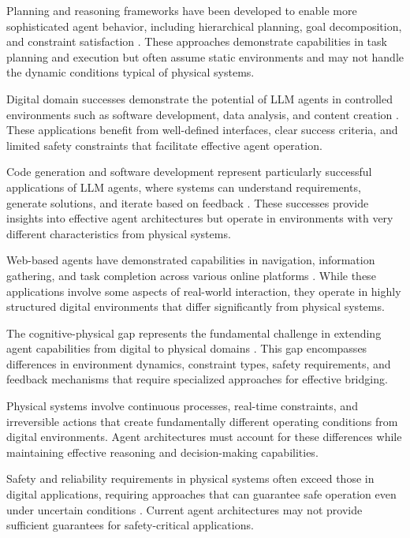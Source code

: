 Planning and reasoning frameworks have been developed to enable more sophisticated agent behavior, including hierarchical planning, goal decomposition, and constraint satisfaction \cite{huang2022language, ahn2022can}. These approaches demonstrate capabilities in task planning and execution but often assume static environments and may not handle the dynamic conditions typical of physical systems.

Digital domain successes demonstrate the potential of LLM agents in controlled environments such as software development, data analysis, and content creation \cite{nijkamp2022codegen, chen2021evaluating}. These applications benefit from well-defined interfaces, clear success criteria, and limited safety constraints that facilitate effective agent operation.

Code generation and software development represent particularly successful applications of LLM agents, where systems can understand requirements, generate solutions, and iterate based on feedback \cite{austin2021program, li2022competition}. These successes provide insights into effective agent architectures but operate in environments with very different characteristics from physical systems.

Web-based agents have demonstrated capabilities in navigation, information gathering, and task completion across various online platforms \cite{deng2023mind2web, zhou2023webarena}. While these applications involve some aspects of real-world interaction, they operate in highly structured digital environments that differ significantly from physical systems.

The cognitive-physical gap represents the fundamental challenge in extending agent capabilities from digital to physical domains \cite{marcus2020next, lake2017building}. This gap encompasses differences in environment dynamics, constraint types, safety requirements, and feedback mechanisms that require specialized approaches for effective bridging.

Physical systems involve continuous processes, real-time constraints, and irreversible actions that create fundamentally different operating conditions from digital environments. Agent architectures must account for these differences while maintaining effective reasoning and decision-making capabilities.

Safety and reliability requirements in physical systems often exceed those in digital applications, requiring approaches that can guarantee safe operation even under uncertain conditions \cite{leveson2011engineering}. Current agent architectures may not provide sufficient guarantees for safety-critical applications.

